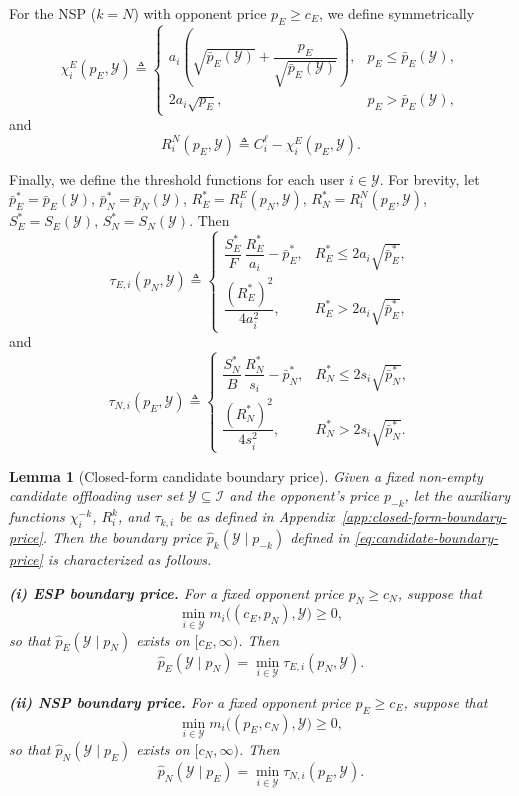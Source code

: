 \documentclass[lettersize,journal]{IEEEtran}
\newtheorem{lemma}{Lemma}
\begin{document}
For the NSP ($k=N$) with opponent price $p_E\ge c_E$, we define symmetrically
\[
\chi_i^E(p_E,\mathcal{Y}) \triangleq
\begin{cases}
a_i\!\left( \sqrt{\bar p_E(\mathcal{Y})} + \dfrac{p_E}{\sqrt{\bar p_E(\mathcal{Y})}} \right), & p_E\le \bar p_E(\mathcal{Y}),\\[2ex]
2a_i\sqrt{p_E}, & p_E>\bar p_E(\mathcal{Y}),
\end{cases}
\]
and
\[
R_i^N(p_E,\mathcal{Y}) \triangleq C_i^\ell - \chi_i^E(p_E,\mathcal{Y}).
\]

Finally, we define the threshold functions for each user $i\in\mathcal{Y}$. 
For brevity, let $\bar p_E^* = \bar p_E(\mathcal{Y})$, $\bar p_N^* = \bar p_N(\mathcal{Y})$, 
$R_E^* = R_i^E(p_N,\mathcal{Y})$, $R_N^* = R_i^N(p_E,\mathcal{Y})$, 
$S_E^* = S_E(\mathcal{Y})$, $S_N^* = S_N(\mathcal{Y})$. Then
\[
\tau_{E,i}(p_N,\mathcal{Y}) \triangleq
\begin{cases}
\dfrac{S_E^*}{F}\, \dfrac{R_E^*}{a_i} - \bar p_E^*, & R_E^*\le 2a_i\sqrt{\bar p_E^*},\\[2.5ex]
\dfrac{(R_E^*)^2}{4a_i^2}, & R_E^* > 2a_i\sqrt{\bar p_E^*},
\end{cases}
\]
and
\[
\tau_{N,i}(p_E,\mathcal{Y}) \triangleq
\begin{cases}
\dfrac{S_N^*}{B}\, \dfrac{R_N^*}{s_i} - \bar p_N^*, & R_N^*\le 2s_i\sqrt{\bar p_N^*},\\[2.5ex]
\dfrac{(R_N^*)^2}{4s_i^2}, & R_N^* > 2s_i\sqrt{\bar p_N^*}.
\end{cases}
\]

\begin{lemma}[Closed-form candidate boundary price]
\label{lem:closed-form-candidate-boundary}
Given a fixed non-empty candidate offloading user set $\mathcal Y\subseteq\mathcal I$ and the opponent's price $p_{-k}$, let the auxiliary functions $\chi_i^{-k}$, $R_i^k$, and $\tau_{k,i}$ be as defined in Appendix~\ref{app:closed-form-boundary-price}. Then the boundary price $\widehat p_k(\mathcal Y\mid p_{-k})$ defined in \eqref{eq:candidate-boundary-price} is characterized as follows.

\textbf{(i) ESP boundary price.}
For a fixed opponent price $p_N\ge c_N$, suppose that
\[
\min_{i\in\mathcal Y} m_i\bigl((c_E,p_N),\mathcal Y\bigr)\ge 0,
\]
so that $\widehat p_E(\mathcal Y\mid p_N)$ exists on $[c_E,\infty)$. Then
\[
\widehat p_E(\mathcal Y\mid p_N)=\min_{i\in\mathcal Y}\tau_{E,i}(p_N,\mathcal Y).
\]

\textbf{(ii) NSP boundary price.}
For a fixed opponent price $p_E\ge c_E$, suppose that
\[
\min_{i\in\mathcal Y} m_i\bigl((p_E,c_N),\mathcal Y\bigr)\ge 0,
\]
so that $\widehat p_N(\mathcal Y\mid p_E)$ exists on $[c_N,\infty)$. Then
\[
\widehat p_N(\mathcal Y\mid p_E)=\min_{i\in\mathcal Y}\tau_{N,i}(p_E,\mathcal Y).
\]
\end{lemma}
\end{document}
